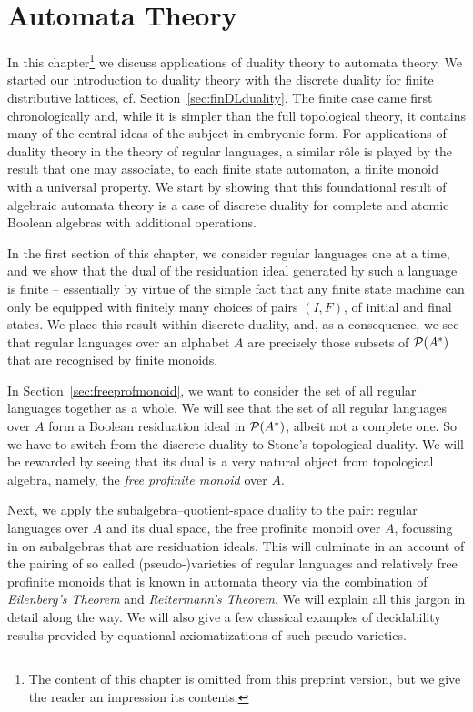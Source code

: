 

\chapter{Automata Theory}\label{ch:AutThry}
In this chapter\footnote{The content of this chapter is omitted from this preprint version, but we give the reader an impression its contents.} we  discuss applications of duality theory to automata theory. We started our introduction to duality theory with the discrete duality for finite distributive lattices, cf. Section~\ref{sec:finDLduality}. The finite case came first chronologically and, while it is simpler than the full topological theory, it contains many of the central ideas of the subject in embryonic form. For applications of duality theory in the theory of regular languages, a similar r\^ole is played by the result that one may associate, to each finite state automaton, a finite monoid with a universal property. We start by showing that this foundational result of algebraic automata theory is a case of discrete duality for complete and atomic Boolean algebras with additional operations.

In the first section of this chapter, we consider regular languages one at a time, and we show that the dual of the residuation ideal generated by such a language is finite -- essentially by virtue of the simple fact that any finite state machine can only be equipped with finitely many choices of pairs $(I,F)$, of initial and final states. We place this result within discrete duality, and, as a consequence, we see that regular languages over an alphabet $A$ are precisely those subsets of $\mathcal{P}(A^*)$ that are recognised by finite monoids. 

In Section~\ref{sec:freeprofmonoid}, we want to consider the set of all regular languages together as a whole. We will see that the set of all regular languages over $A$ form a Boolean residuation ideal in $\mathcal{P}(A^*)$, albeit not a complete one. So we have to switch from the discrete duality to Stone's topological duality. We will be rewarded by seeing that its dual is a very natural object from topological algebra, namely, the \emph{free profinite monoid} over $A$. 

Next, we apply the subalgebra--quotient-space duality to the pair: regular languages over $A$ and its dual space, the free profinite monoid over $A$, focussing in on subalgebras that are residuation ideals. This will culminate in an account of the pairing of so called (pseudo-)varieties of regular languages and relatively free profinite monoids that is known in automata theory via the combination of \emph{Eilenberg's Theorem} and \emph{Reitermann's Theorem}. We will explain all this jargon in detail along the way. We will also give a few classical examples of decidability results provided by equational axiomatizations of such pseudo-varieties. 

